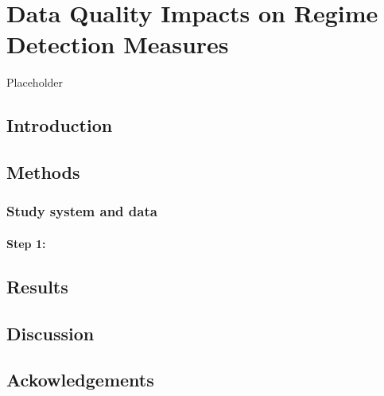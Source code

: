 \documentclass[12pt,twoside,openany]{reedthesis}
\begin{document}
\hypertarget{resampling}{%
\chapter{Data Quality Impacts on Regime Detection Measures}\label{resampling}}

Placeholder

\hypertarget{introduction-3}{%
\section{Introduction}\label{introduction-3}}

\hypertarget{methods-1}{%
\section{Methods}\label{methods-1}}

\hypertarget{study-system-and-data}{%
\subsection{Study system and data}\label{study-system-and-data}}

\hypertarget{step-1}{%
\subsubsection{Step 1:}\label{step-1}}

\hypertarget{results-2}{%
\section{Results}\label{results-2}}

\hypertarget{discussion-2}{%
\section{Discussion}\label{discussion-2}}

\hypertarget{ackowledgements}{%
\section{Ackowledgements}\label{ackowledgements}}
\end{document}

